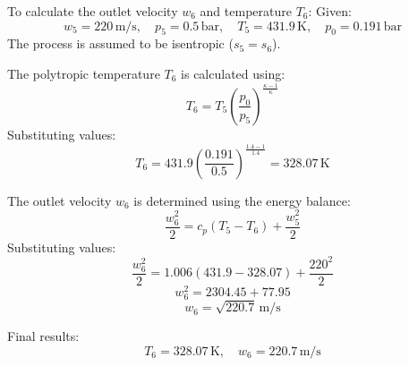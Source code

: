 To calculate the outlet velocity \( w_6 \) and temperature \( T_6 \):  
Given:  
\[
w_5 = 220 \, \text{m/s}, \quad p_5 = 0.5 \, \text{bar}, \quad T_5 = 431.9 \, \text{K}, \quad p_0 = 0.191 \, \text{bar}
\]  
The process is assumed to be isentropic (\( s_5 = s_6 \)).  

The polytropic temperature \( T_6 \) is calculated using:  
\[
T_6 = T_5 \left( \frac{p_0}{p_5} \right)^{\frac{\kappa - 1}{\kappa}}
\]  
Substituting values:  
\[
T_6 = 431.9 \left( \frac{0.191}{0.5} \right)^{\frac{1.4 - 1}{1.4}} = 328.07 \, \text{K}
\]  

The outlet velocity \( w_6 \) is determined using the energy balance:  
\[
\frac{w_6^2}{2} = c_p (T_5 - T_6) + \frac{w_5^2}{2}
\]  
Substituting values:  
\[
\frac{w_6^2}{2} = 1.006 (431.9 - 328.07) + \frac{220^2}{2}
\]  
\[
w_6^2 = 2304.45 + 77.95
\]  
\[
w_6 = \sqrt{220.7} \, \text{m/s}
\]  

Final results:  
\[
T_6 = 328.07 \, \text{K}, \quad w_6 = 220.7 \, \text{m/s}
\]